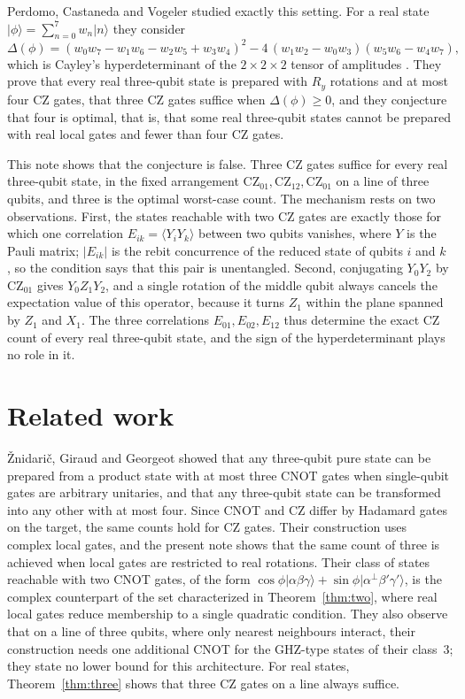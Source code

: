 \documentclass[11pt,a4paper]{article}
\theoremstyle{definition}
\theoremstyle{plain}
\newcommand{\ket}[1]{\lvert#1\rangle}
\newcommand{\CZ}{\mathrm{CZ}}
\begin{document}
Perdomo, Castaneda and Vogeler \cite{Perdomo2022} studied exactly this
setting. For a real state $\ket\phi=\sum_{n=0}^{7}w_n\ket n$ they consider
\begin{equation}\label{eq:delta}
\Delta(\phi)=(w_0w_7-w_1w_6-w_2w_5+w_3w_4)^2-4\,(w_1w_2-w_0w_3)(w_5w_6-w_4w_7),
\end{equation}
which is Cayley's hyperdeterminant of the $2\times2\times2$ tensor of
amplitudes \cite{Wootters2014}. They prove that every real three-qubit state is prepared with
$R_y$ rotations and at most four CZ gates, that three CZ gates suffice when
$\Delta(\phi)\ge0$, and they conjecture that four is optimal, that is, that
some real three-qubit states cannot be prepared with real local gates and
fewer than four CZ gates.

This note shows that the conjecture is false. Three CZ gates suffice for every
real three-qubit state, in the fixed arrangement $\CZ_{01},\CZ_{12},\CZ_{01}$
on a line of three qubits, and three is the optimal worst-case count. The
mechanism rests on two observations. First, the states reachable with two CZ
gates are exactly those for which one correlation
$E_{ik}=\langle Y_iY_k\rangle$ between two qubits vanishes, where $Y$ is the
Pauli matrix; $\lvert E_{ik}\rvert$ is the rebit concurrence of the reduced
state of qubits $i$ and $k$ \cite{CavesFuchsRungta2001}, so the condition says
that this pair is unentangled. Second, conjugating $Y_0Y_2$ by $\CZ_{01}$ gives $Y_0Z_1Y_2$, and
a single rotation of the middle qubit always cancels the expectation value of
this operator, because it turns $Z_1$ within the plane spanned by $Z_1$ and
$X_1$. The three correlations $E_{01},E_{02},E_{12}$ thus determine the exact
CZ count of every real three-qubit state, and the sign of the hyperdeterminant
plays no role in it.

\section{Related work}\label{sec:related}
\v{Z}nidari\v{c}, Giraud and Georgeot \cite{Znidaric2008} showed that any three-qubit
pure state can be prepared from a product state with at most three CNOT gates
when single-qubit gates are arbitrary unitaries, and that any three-qubit state
can be transformed into any other with at most four. Since CNOT and CZ differ by
Hadamard gates on the target, the same counts hold for CZ gates. Their
construction uses complex local gates, and the present note shows that the
same count of three is achieved when local gates are restricted to real
rotations. Their class of states reachable with two CNOT gates, of the form
$\cos\phi\ket{\alpha\beta\gamma}+\sin\phi\ket{\alpha^\perp\beta'\gamma'}$, is
the complex counterpart of the set characterized in Theorem~\ref{thm:two},
where real local gates reduce membership to a single quadratic condition. They
also observe that on a line of three qubits, where only nearest neighbours
interact, their construction needs one additional CNOT for the GHZ-type states
of their class~3; they state no lower bound for this architecture. For real
states, Theorem~\ref{thm:three} shows that three CZ gates on a line always
suffice.
\end{document}
